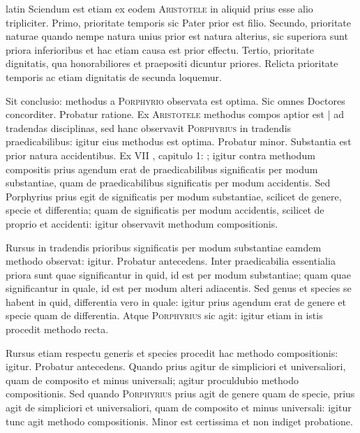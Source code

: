 \begin{otherlanguage*}{latin}
\pstart
Sciendum est etiam ex eodem \textsc{Aristotele} in  aliquid prius esse alio tripliciter. Primo, prioritate temporis sic Pater prior est filio. Secundo, prioritate naturae quando nempe natura unius prior est natura alterius, sic superiora sunt priora inferioribus et hac etiam causa est prior effectu. Tertio, prioritate dignitatis, qua honorabiliores et praepositi dicuntur priores. Relicta prioritate temporis ac etiam dignitatis de secunda loquemur. 
\pend

\pstart
Sit conclusio:
methodus a \textsc{Porphyrio} observata est optima. Sic omnes Doctores concorditer. Probatur ratione. Ex \textsc{Aristotele} methodus compos aptior est \textnormal{|} ad tradendas disciplinas, sed hanc observavit \textsc{Porphyrius} in tradendis praedicabilibus:
igitur eius methodus est optima. Probatur minor. Substantia est prior natura accidentibus. Ex  VII , capitulo 1:
; igitur contra methodum compositis prius agendum erat de praedicabilibus significatis per modum substantiae, quam de praedicabilibus significatis per modum accidentis. Sed Porphyrius prius egit de significatis per modum substantiae, scilicet de genere, specie et differentia; quam de significatis per modum accidentis, scilicet de proprio et accidenti:
igitur observavit methodum compositionis. 
\pend

\pstart
Rursus in tradendis prioribus significatis per modum substantiae eamdem methodo observat:
igitur. Probatur antecedens. Inter praedicabilia essentialia priora sunt quae significantur in quid, id est per modum substantiae; quam quae significantur in quale, id est per modum alteri adiacentis. Sed genus et species se habent in quid, differentia vero in quale:
igitur prius agendum erat de genere et specie quam de differentia. Atque \textsc{Porphyrius} sic agit:
igitur etiam in istis procedit methodo recta. 
\pend

\pstart
Rursus etiam respectu generis et species procedit hac methodo compositionis:
igitur. Probatur antecedens. Quando prius agitur de simpliciori et universaliori, quam de composito et minus universali; agitur proculdubio methodo compositionis. Sed quando \textsc{Porphyrius} prius agit de genere quam de specie, prius agit de simpliciori et universaliori, quam de composito et minus universali:
igitur tunc agit methodo compositionis. Minor est certissima et non indiget probatione. 
\pend


\end{otherlanguage*}
